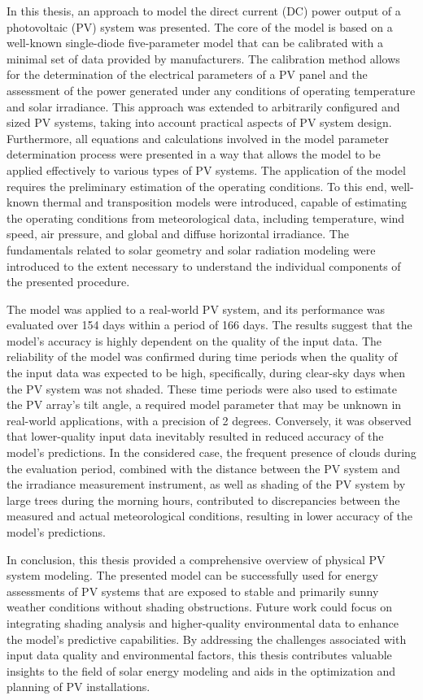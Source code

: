 In this thesis, an approach to model the direct current (DC) power
output of a photovoltaic (PV) system was presented. The core of
the model is based on a well-known single-diode five-parameter
model that can be calibrated with a minimal set of data provided
by manufacturers. The calibration method allows for the determination
of the electrical parameters of a PV panel and the assessment of
the power generated under any conditions of operating temperature
and solar irradiance. This approach was extended to arbitrarily
configured and sized PV systems, taking into account practical
aspects of PV system design. Furthermore, all equations and calculations
involved in the model parameter determination process were presented
in a way that allows the model to be applied effectively to various
types of PV systems. The application of the model requires the
preliminary estimation of the operating conditions. To this end,
well-known thermal and transposition models were introduced,
capable of estimating the operating conditions from meteorological
data, including temperature, wind speed, air pressure, and global
and diffuse horizontal irradiance. The fundamentals related to
solar geometry and solar radiation modeling were introduced to
the extent necessary to understand the individual components of
the presented procedure.

The model was applied to a real-world PV system, and its performance
was evaluated over 154 days within a period of 166 days. The results
suggest that the model's accuracy is highly dependent on the quality
of the input data. The reliability of the model was confirmed during
time periods when the quality of the input data was expected to be
high, specifically, during clear-sky days when the PV system was
not shaded. These time periods were also used to estimate the PV
array's tilt angle, a required model parameter that may be unknown
in real-world applications, with a precision of 2 degrees. Conversely,
it was observed that lower-quality input data inevitably resulted in
reduced accuracy of the model's predictions. In the considered case,
the frequent presence of clouds during the evaluation period, combined
with the distance between the PV system and the irradiance measurement
instrument, as well as shading of the PV system by large trees during
the morning hours, contributed to discrepancies between the measured
and actual meteorological conditions, resulting in lower accuracy of
the model's predictions.

In conclusion, this thesis provided a comprehensive overview of
physical PV system modeling. The presented model can be successfully
used for energy assessments of PV systems that are exposed to stable
and primarily sunny weather conditions without shading obstructions.
Future work could focus on integrating shading analysis and higher-quality
environmental data to enhance the model's predictive capabilities. By
addressing the challenges associated with input data quality and
environmental factors, this thesis contributes valuable insights
to the field of solar energy modeling and aids in the optimization
and planning of PV installations.
